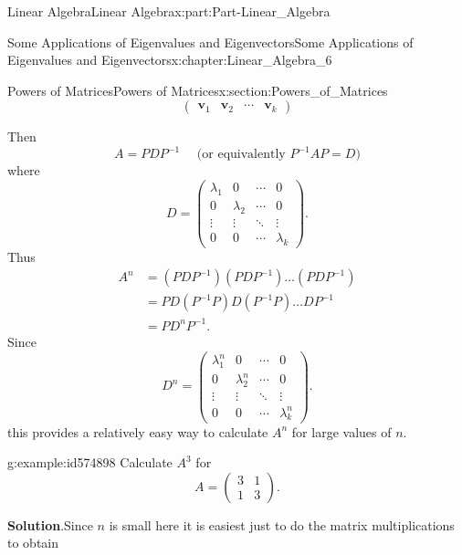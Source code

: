 \documentclass[oneside,10pt,]{book}
\newcommand{\blocktitlefont}{\relax}
\numberwithin{equation}{section}
\newcommand{\bm}[1]{\boldsymbol{#1}}
\newcommand{\amp}{&}
\begin{document}
\begin{partptx}{Linear Algebra}{}{Linear Algebra}{}{}{x:part:Part-Linear_Algebra}
\begin{chapterptx}{Some Applications of Eigenvalues and Eigenvectors}{}{Some Applications of Eigenvalues and Eigenvectors}{}{}{x:chapter:Linear_Algebra_6}
\begin{sectionptx}{Powers of Matrices}{}{Powers of Matrices}{}{}{x:section:Powers_of_Matrices}
\begin{equation*}
\begin{pmatrix}
\bm{v}_1 \amp \bm{v}_2 \amp \cdots \amp \bm{v}_k
\end{pmatrix}
\end{equation*}
%
\par
Then%
\begin{equation*}
A = PDP^{-1} \quad \text{ (or equivalently } P^{-1}AP = D)
\end{equation*}
where%
\begin{equation*}
D = \begin{pmatrix}
\lambda_1 \amp 0 \amp \cdots \amp 0 \\
0 \amp \lambda_2 \amp \cdots \amp 0 \\
\vdots \amp \vdots \amp \ddots \amp \vdots \\
0 \amp 0 \amp \cdots \amp \lambda_k
\end{pmatrix}\text{.}
\end{equation*}
Thus%
\begin{align*}
A^n \amp = \left( PDP^{-1} \right) \left( PDP^{-1} \right) \ldots \left( PDP^{-1} \right)\\
\amp = PD \left( P^{-1} P \right)D \left( P^{-1} P \right) \ldots DP^{-1}\\
\amp = PD^n P^{-1}\text{.}
\end{align*}
Since%
\begin{equation*}
D^n = \begin{pmatrix}
\lambda_1^n \amp 0 \amp \cdots \amp 0 \\
0 \amp \lambda_2^n \amp \cdots \amp 0 \\
\vdots \amp \vdots \amp \ddots \amp \vdots \\
0 \amp 0 \amp \cdots \amp \lambda_k^n
\end{pmatrix}\text{.}
\end{equation*}
this provides a relatively easy way to calculate \(A^n\) for large values of \(n\).%
\begin{example}{}{g:example:id574898}%
Calculate \(A^3\) for%
\begin{equation*}
A = \begin{pmatrix} 3 \amp 1 \\ 1 \amp 3 \end{pmatrix}\text{.}
\end{equation*}
%
\par\smallskip%
\noindent\textbf{\blocktitlefont Solution}.\hypertarget{g:solution:id574876}{}\quad{}Since \(n\) is small here it is easiest just to do the matrix multiplications to obtain%
\begin{equation*}

\end{equation*}
\end{example}
\end{sectionptx}
\end{chapterptx}
\end{partptx}
\end{document}
